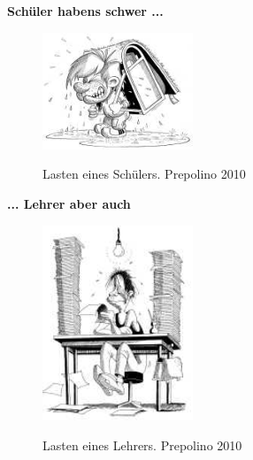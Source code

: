 
\begin{center}
	\textbf{Schüler haben\grq s schwer ...}
\end{center}

\begin{figure}[h]
	\centering
		\includegraphics[width=0.4\textwidth]{images/Lasten-eines-Schuelers.jpg}\\
	\caption{Lasten eines Schülers. Prepolino 2010}
	\label{fig:Lasten-eines-Schuelers}
\end{figure}

\begin{center}
	\textbf{... Lehrer aber auch}
\end{center}

\begin{figure}[h]
	\centering
		\includegraphics[width=0.4\textwidth]{images/Lasten-eines-Lehrers.jpg}\\
	\caption{Lasten eines Lehrers. Prepolino 2010}
	\label{fig:Lasten-eines-Lehrers}
\end{figure}






